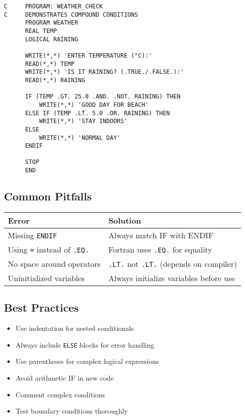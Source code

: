 \documentclass{book}
\begin{document}
\begin{verbatim}
C     PROGRAM: WEATHER_CHECK
C     DEMONSTRATES COMPOUND CONDITIONS
      PROGRAM WEATHER
      REAL TEMP
      LOGICAL RAINING
      
      WRITE(*,*) 'ENTER TEMPERATURE (°C):'
      READ(*,*) TEMP
      WRITE(*,*) 'IS IT RAINING? (.TRUE./.FALSE.):'
      READ(*,*) RAINING
      
      IF (TEMP .GT. 25.0 .AND. .NOT. RAINING) THEN
          WRITE(*,*) 'GOOD DAY FOR BEACH'
      ELSE IF (TEMP .LT. 5.0 .OR. RAINING) THEN
          WRITE(*,*) 'STAY INDOORS'
      ELSE
          WRITE(*,*) 'NORMAL DAY'
      ENDIF
      
      STOP
      END
\end{verbatim}

\subsection*{Common Pitfalls}
\begin{center}
\begin{tabular}{|p{4cm}|p{8cm}|}
\hline
\textbf{Error} & \textbf{Solution} \\ 
\hline
Missing \texttt{ENDIF} & Always match IF with ENDIF \\
\hline
Using \texttt{=} instead of \texttt{.EQ.} & Fortran uses \texttt{.EQ.} for equality \\
\hline
No space around operators & \texttt{.LT.} not \texttt{.LT.} (depends on compiler) \\
\hline
Uninitialized variables & Always initialize variables before use \\
\hline
\end{tabular}
\end{center}

\subsection*{Best Practices}
\begin{itemize}
    \item Use indentation for nested conditionals
    \item Always include \texttt{ELSE} blocks for error handling
    \item Use parentheses for complex logical expressions
    \item Avoid arithmetic IF in new code
    \item Comment complex conditions
    \item Test boundary conditions thoroughly
\end{itemize}
\end{document}
